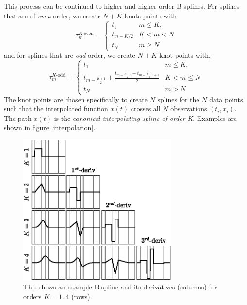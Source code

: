 \documentclass[10pt,journal]{IEEEtran}
\begin{document}
This process can be continued to higher and higher order B-splines. For splines that are of \emph{even} order, we create $N+K$ knots points with
\begin{equation}
\tau_m^{\text{$K$-even}} = \begin{cases}
t_1      	& \text{$m \leq K$}, \\
t_{m-K/2}	& \text{$K < m < N$}\\
t_N 		& \text{$m \geq N$}
\end{cases}
\label{even-knots}
\end{equation}
and for splines that are \emph{odd} order, we create $N+K$ knot points with,
\begin{equation}
\tau_m^{\text{$K$-odd}} = \begin{cases}
t_1      	& \text{$m \leq K$}, \\
t_{m-\frac{K+1}{2}} + \frac{t_{m-\frac{K+1}{2}}-t_{m-\frac{K+1}{2}+1}}{2}	& \text{$K < m \leq N$}\\
t_N 		& \text{$m > N$}
\end{cases}
\label{odd-knots}
\end{equation}
The knot points are chosen specifically to create $N$ splines for the $N$ data points such that the interpolated function $x(t)$ crosses all $N$ observations $(t_i,x_i)$. The path $x(t)$ is the \emph{canonical interpolating spline of order K}. Examples are shown in figure \ref{interpolation}.

\begin{figure}
  \centerline{\includegraphics[width=19pc,angle=0]{figures/bsplines}}
  \caption{This shows an example B-spline and its derivatives (columns) for orders $K=1..4$ (rows).}
  \label{bsplines}
\end{figure}
\end{document}
